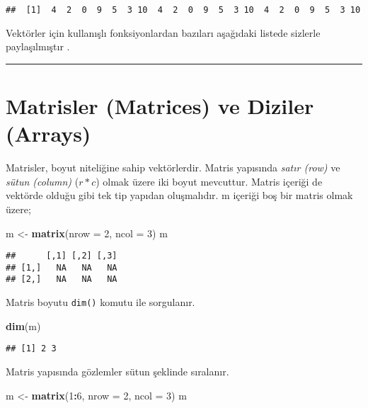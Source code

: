 \documentclass[
]{book}
\newenvironment{Shaded}{\begin{snugshade}}{\end{snugshade}}
\newcommand{\DataTypeTok}[1]{\textcolor[rgb]{0.13,0.29,0.53}{#1}}
\newcommand{\DecValTok}[1]{\textcolor[rgb]{0.00,0.00,0.81}{#1}}
\newcommand{\KeywordTok}[1]{\textcolor[rgb]{0.13,0.29,0.53}{\textbf{#1}}}
\newcommand{\NormalTok}[1]{#1}
\newcommand{\OperatorTok}[1]{\textcolor[rgb]{0.81,0.36,0.00}{\textbf{#1}}}
\newcommand{\StringTok}[1]{\textcolor[rgb]{0.31,0.60,0.02}{#1}}
\begin{document}
\begin{verbatim}
##  [1]  4  2  0  9  5  3 10  4  2  0  9  5  3 10  4  2  0  9  5  3 10
\end{verbatim}

Vektörler için kullanışlı fonksiyonlardan bazıları aşağıdaki listede sizlerle paylaşılmıştır \citep{Crawley2012}.

\begin{center}\rule{0.5\linewidth}{0.5pt}\end{center}

\hypertarget{matrisler-matrices-ve-diziler-arrays}{%
\section{Matrisler (Matrices) ve Diziler (Arrays)}\label{matrisler-matrices-ve-diziler-arrays}}

Matrisler, boyut niteliğine sahip vektörlerdir. Matris yapısında \emph{satır (row)} ve \emph{sütun (column)} (\(r*c\)) olmak üzere iki boyut mevcuttur. Matris içeriği de vektörde olduğu gibi tek tip yapıdan oluşmalıdır. m içeriği boş bir matris olmak üzere;

\begin{Shaded}
\begin{Highlighting}[]
\NormalTok{m <-}\StringTok{ }\KeywordTok{matrix}\NormalTok{(}\DataTypeTok{nrow =} \DecValTok{2}\NormalTok{, }\DataTypeTok{ncol =} \DecValTok{3}\NormalTok{)}
\NormalTok{m}
\end{Highlighting}
\end{Shaded}

\begin{verbatim}
##      [,1] [,2] [,3]
## [1,]   NA   NA   NA
## [2,]   NA   NA   NA
\end{verbatim}

Matris boyutu \texttt{dim()} komutu ile sorgulanır.

\begin{Shaded}
\begin{Highlighting}[]
\KeywordTok{dim}\NormalTok{(m)}
\end{Highlighting}
\end{Shaded}

\begin{verbatim}
## [1] 2 3
\end{verbatim}

Matris yapısında gözlemler sütun şeklinde sıralanır.

\begin{Shaded}
\begin{Highlighting}[]
\NormalTok{m <-}\StringTok{ }\KeywordTok{matrix}\NormalTok{(}\DecValTok{1}\OperatorTok{:}\DecValTok{6}\NormalTok{, }\DataTypeTok{nrow =} \DecValTok{2}\NormalTok{, }\DataTypeTok{ncol =} \DecValTok{3}\NormalTok{) }
\NormalTok{m}
\end{Highlighting}
\end{Shaded}
\end{document}

